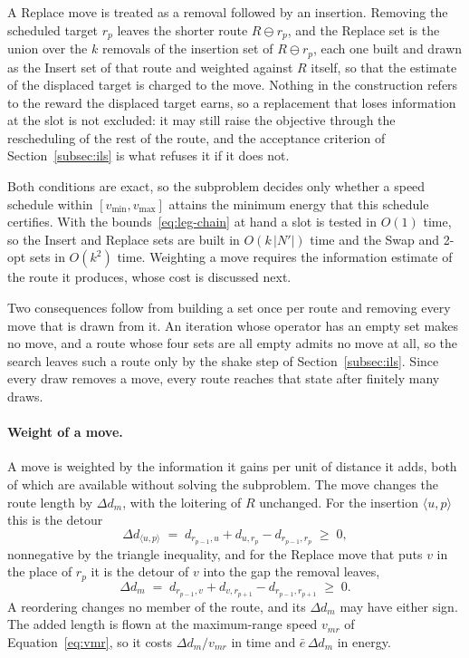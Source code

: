 A Replace move is treated as a removal followed by an insertion. Removing the scheduled target $r_p$ leaves the shorter route $R \ominus r_p$, and the Replace set is the union over the $k$ removals of the insertion set of $R \ominus r_p$, each one built and drawn as the Insert set of that route and weighted against $R$ itself, so that the estimate of the displaced target is charged to the move. Nothing in the construction refers to the reward the displaced target earns, so a replacement that loses information at the slot is not excluded: it may still raise the objective through the rescheduling of the rest of the route, and the acceptance criterion of Section~\ref{subsec:ils} is what refuses it if it does not.

Both conditions are exact, so the subproblem decides only whether a speed schedule within $[v_{\min}, v_{\max}]$ attains the minimum energy that this schedule certifies. With the bounds~\eqref{eq:leg-chain} at hand a slot is tested in $O(1)$ time, so the Insert and Replace sets are built in $O(k\,|N'|)$ time and the Swap and 2-opt sets in $O(k^2)$ time. Weighting a move requires the information estimate of the route it produces, whose cost is discussed next.

Two consequences follow from building a set once per route and removing every move that is drawn from it. An iteration whose operator has an empty set makes no move, and a route whose four sets are all empty admits no move at all, so the search leaves such a route only by the shake step of Section~\ref{subsec:ils}. Since every draw removes a move, every route reaches that state after finitely many draws.

\paragraph{Weight of a move.}
A move is weighted by the information it gains per unit of distance it adds, both of which are available without solving the subproblem. The move changes the route length by $\Delta d_m$, with the loitering of $R$ unchanged. For the insertion $\langle u, p \rangle$ this is the detour
\begin{equation}\label{eq:detour}
    \Delta d_{\langle u, p \rangle} \;=\; d_{r_{p-1}, u} + d_{u, r_p} - d_{r_{p-1}, r_p} \;\ge\; 0 ,
\end{equation}
nonnegative by the triangle inequality, and for the Replace move that puts $v$ in the place of $r_p$ it is the detour of $v$ into the gap the removal leaves,
\begin{equation}\label{eq:replace-weight}
    \Delta d_m \;=\; d_{r_{p-1}, v} + d_{v, r_{p+1}} - d_{r_{p-1}, r_{p+1}} \;\ge\; 0 .
\end{equation}
A reordering changes no member of the route, and its $\Delta d_m$ may have either sign. The added length is flown at the maximum-range speed $v_{mr}$ of Equation~\eqref{eq:vmr}, so it costs $\Delta d_m / v_{mr}$ in time and $\bar{e}\,\Delta d_m$ in energy.

